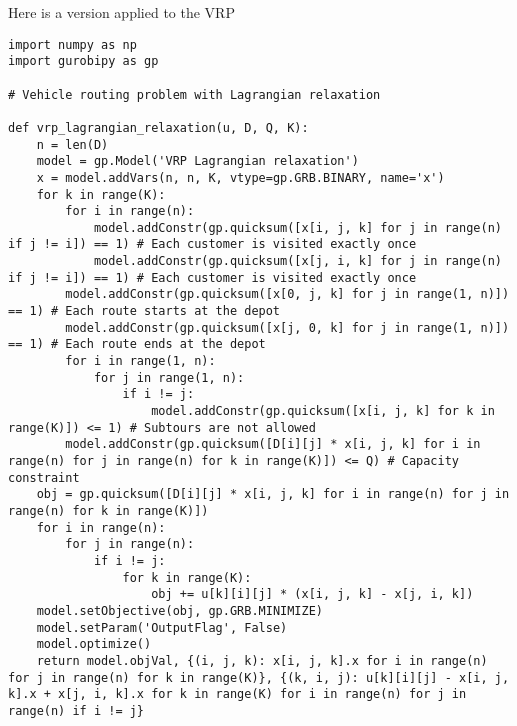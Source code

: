Here is a version applied to the VRP
\begin{verbatim}
import numpy as np
import gurobipy as gp

# Vehicle routing problem with Lagrangian relaxation

def vrp_lagrangian_relaxation(u, D, Q, K):
    n = len(D)
    model = gp.Model('VRP Lagrangian relaxation')
    x = model.addVars(n, n, K, vtype=gp.GRB.BINARY, name='x')
    for k in range(K):
        for i in range(n):
            model.addConstr(gp.quicksum([x[i, j, k] for j in range(n) if j != i]) == 1) # Each customer is visited exactly once
            model.addConstr(gp.quicksum([x[j, i, k] for j in range(n) if j != i]) == 1) # Each customer is visited exactly once
        model.addConstr(gp.quicksum([x[0, j, k] for j in range(1, n)]) == 1) # Each route starts at the depot
        model.addConstr(gp.quicksum([x[j, 0, k] for j in range(1, n)]) == 1) # Each route ends at the depot
        for i in range(1, n):
            for j in range(1, n):
                if i != j:
                    model.addConstr(gp.quicksum([x[i, j, k] for k in range(K)]) <= 1) # Subtours are not allowed
        model.addConstr(gp.quicksum([D[i][j] * x[i, j, k] for i in range(n) for j in range(n) for k in range(K)]) <= Q) # Capacity constraint
    obj = gp.quicksum([D[i][j] * x[i, j, k] for i in range(n) for j in range(n) for k in range(K)])
    for i in range(n):
        for j in range(n):
            if i != j:
                for k in range(K):
                    obj += u[k][i][j] * (x[i, j, k] - x[j, i, k])
    model.setObjective(obj, gp.GRB.MINIMIZE)
    model.setParam('OutputFlag', False)
    model.optimize()
    return model.objVal, {(i, j, k): x[i, j, k].x for i in range(n) for j in range(n) for k in range(K)}, {(k, i, j): u[k][i][j] - x[i, j, k].x + x[j, i, k].x for k in range(K) for i in range(n) for j in range(n) if i != j}


\end{verbatim}
